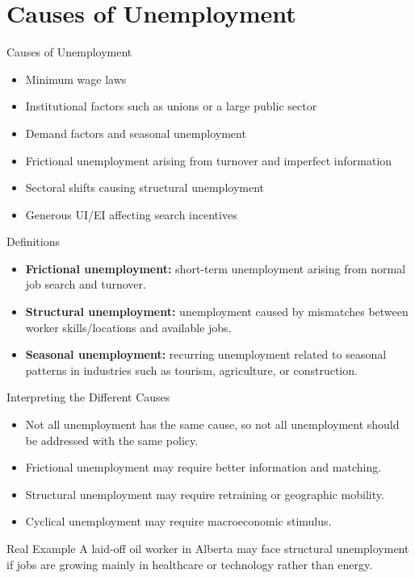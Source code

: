 \documentclass[aspectratio=169]{beamer}
\begin{document}
\section{Causes of Unemployment}

\begin{frame}{Causes of Unemployment}
\transfade
\begin{itemize}
  \item Minimum wage laws
  \item Institutional factors such as unions or a large public sector
  \item Demand factors and seasonal unemployment
  \item Frictional unemployment arising from turnover and imperfect information
  \item Sectoral shifts causing structural unemployment
  \item Generous UI/EI affecting search incentives
\end{itemize}

\begin{block}{Definitions}
\begin{itemize}
  \item \textbf{Frictional unemployment:} short-term unemployment arising from normal job search and turnover.
  \item \textbf{Structural unemployment:} unemployment caused by mismatches between worker skills/locations and available jobs.
  \item \textbf{Seasonal unemployment:} recurring unemployment related to seasonal patterns in industries such as tourism, agriculture, or construction.
\end{itemize}
\end{block}
\end{frame}

\begin{frame}{Interpreting the Different Causes}
\transfade
\begin{itemize}
  \item Not all unemployment has the same cause, so not all unemployment should be addressed with the same policy.
  \item Frictional unemployment may require better information and matching.
  \item Structural unemployment may require retraining or geographic mobility.
  \item Cyclical unemployment may require macroeconomic stimulus.
\end{itemize}

\begin{exampleblock}{Real Example}
A laid-off oil worker in Alberta may face structural unemployment if jobs are growing mainly in healthcare or technology rather than energy.
\end{exampleblock}
\end{frame}
\end{document}
